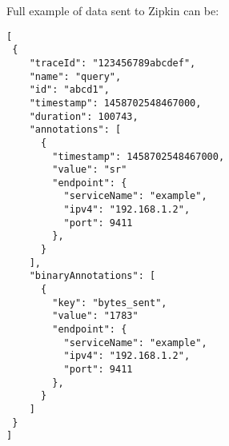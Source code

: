 Full example of data sent to Zipkin can be:
\begin{lstlisting}[emph={traceId, name, id, timestamp, duration, annotations, value, endpoint, serviceName, ipv4, port, binnaryAnnotations, key},emphstyle={\textbf}]
[
 {
    "traceId": "123456789abcdef",
    "name": "query",
    "id": "abcd1",
    "timestamp": 1458702548467000,
    "duration": 100743,
    "annotations": [
      {
        "timestamp": 1458702548467000,
        "value": "sr"
        "endpoint": {
          "serviceName": "example",
          "ipv4": "192.168.1.2",
          "port": 9411
        },
      }
    ],
    "binaryAnnotations": [
      {
        "key": "bytes_sent",
        "value": "1783"
        "endpoint": {
          "serviceName": "example",
          "ipv4": "192.168.1.2",
          "port": 9411
        },
      }
    ]
 }
]
\end{lstlisting}


